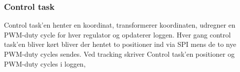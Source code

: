 \subsubsection{Control task}
\label{sec:control_task}
Control task'en henter en koordinat, transformerer koordinaten,
udregner en PWM-duty cycle for hver regulator og opdaterer loggen.
Hver gang control task'en bliver kørt bliver der hentet to positioner
ind via SPI mens de to nye PWM-duty cycles sendes.
Ved tracking skriver Control task'en positioner og PWM-duty cycles i loggen,

% 

